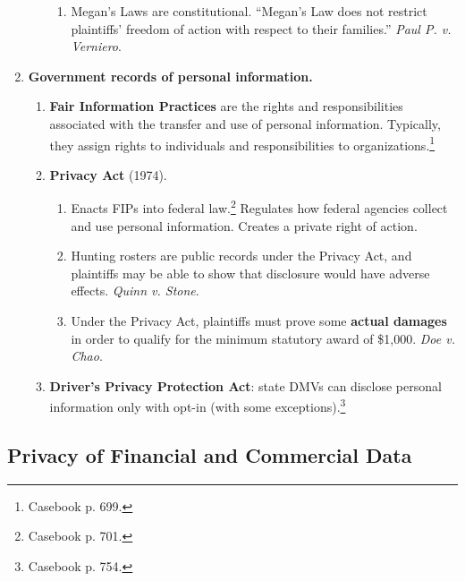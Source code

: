 \begin{enumerate}
\begin{enumerate}
\begin{enumerate}
            \item Megan's Laws are constitutional. ``Megan's Law does not 
            restrict plaintiffs' freedom of action with respect to their 
            families.'' \emph{Paul P. v. Verniero}.
        \end{enumerate}
    \end{enumerate}
    \item \textbf{Government records of personal information.}
    \begin{enumerate}
        \item \textbf{Fair Information Practices} are the rights and 
        responsibilities associated with the transfer and use of personal 
        information. Typically, they assign rights to individuals and 
        responsibilities to organizations.\footnote{Casebook p.  699.}
        \item \textbf{Privacy Act} (1974).
        \begin{enumerate}
            \item Enacts FIPs into federal law.\footnote{Casebook p. 701.} 
            Regulates how federal agencies collect and use personal 
            information. Creates a private right of action.
            \item Hunting rosters are public records under the Privacy Act, 
            and plaintiffs may be able to show that disclosure would have 
            adverse effects. \emph{Quinn v. Stone}.
            \item Under the Privacy Act, plaintiffs must prove some 
            \textbf{actual damages} in order to qualify for the minimum 
            statutory award of \$1,000. \emph{Doe v. Chao}.
        \end{enumerate}
        \item \textbf{Driver's Privacy Protection Act}: state DMVs can 
        disclose personal information only with opt-in (with some 
        exceptions).\footnote{Casebook p. 754.}
    \end{enumerate}
\end{enumerate}

\newpage

\subsection{Privacy of Financial and Commercial Data}

